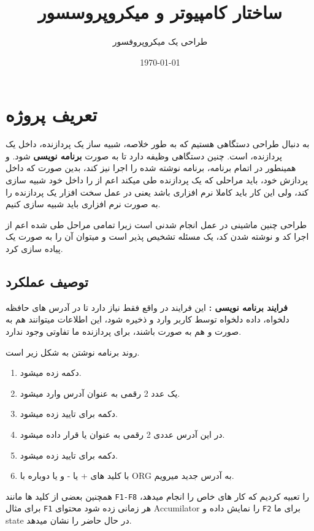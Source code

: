\documentclass[11pt]{article}
\title{ساختار کامپیوتر و میکروپروسسور}
\subtitle{طراحی یک میکروپروفسور}
\date{\today}
\begin{document}
\maketitlepage
\maketitlestart

\section{تعریف پروژه}

به دنبال طراحی دستگاهی هستیم که به طور خلاصه، شبیه ساز یک
پردازنده، داخل یک پردازنده، است. چنین دستگاهی وظیفه دارد تا
به صورت  \textbf{برنامه نویسی} شود. و همینطور در
اتمام برنامه، برنامه نوشته شده را اجرا نیز کند، بدین صورت که داخل
پردازش خود، باید مراحلی که یک پردازنده طی میکند اعم از
 را داخل خود شبیه سازی کند، ولی این
کار باید کاملا نرم افزاری باشد یعنی در عمل سخت افزار یک پردازنده را
به صورت نرم افزاری باید شبیه سازی کنیم.

طراحی چنین ماشینی در عمل انجام شدنی است زیرا تمامی مراحل طی شده
اعم از اجرا کد و نوشته شدن کد، یک مسئله تشخیص پذیر است و میتوان آن را
به صورت یک  پیاده سازی کرد.

\subsection{توصیف عملکرد}

\textbf{فرایند برنامه نویسی : }
این فرایند در واقع فقط نیاز دارد تا در آدرس های حافظه دلخواه، داده دلخواه توسط کاربر وارد
و ذخیره شود، این اطلاعات میتوانند هم به صورت  و هم به صورت  باشند،
برای پردازنده ما تفاوتی وجود ندارد.

روند برنامه نوشتن به شکل زیر است.

\begin{enumerate}
	\item دکمه  زده میشود.
	\item یک عدد 2 رقمی به عنوان آدرس وارد میشود.
	\item دکمه  برای تایید زده میشود.
	\item در این آدرس عددی 2 رقمی به عنوان  یا  قرار داده میشود.
	\item دکمه  برای تایید زده میشود.
	\item با کلید های + یا - و یا دوباره با ORG به آدرس جدید میرویم.
\end{enumerate}

همچنین بعضی از کلید ها مانند \texttt{F1-F8} را تعبیه کردیم که کار های خاص را انجام میدهد،
برای مثال \texttt{F1} هر زمانی زده شود محتوای Accumilator را نمایش داده و \texttt{F2} برای ما state در
حال حاضر را نشان میدهد.
\end{document}
